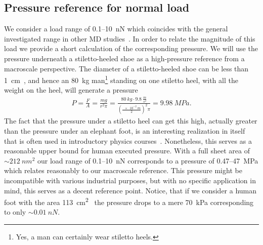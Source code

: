 \subsection{Pressure reference for normal load}
We consider a load range of 0.1--\SI{10}{nN} which coincides with the general investigated range in other \acrshort{MD} studies~\cite{li_evolving_2016, zhu_study_2018, zhu_study_2018}. In order to relate the magnitude of this load we provide a short calculation of the corresponding pressure. We will use the pressure underneath a stiletto-heeled shoe as a high-pressure reference from a macroscale perspective. The diameter of a stiletto-heeled
shoe can be less than \SI{1}{cm}~\cite{stiletto_1}, and hence an \SI{80}{kg} man\footnote{Yes, a man can certainly
wear stiletto heels.} standing on one stiletto heel, with all the weight on the heel, will generate a pressure
\begin{align*}
  P = \frac{F}{A} = \frac{mg}{r^2\pi} = \frac{\SI{80}{kg} \cdot \SI{9.8}{\frac{m}{s^2}}}{{(\frac{\SI{e-2}{m}}{2})}^2 \pi} = \SI{9.98}{MPa}.
\end{align*} 
The fact that the pressure under a stiletto heel can get this high, actually greater than the pressure under an elephant foot, is an interesting realization in itself that is often used in
introductory physics courses~\cite{stiletto_2}. Nonetheless, this serves as a reasonable upper bound for human executed pressure. With
a full sheet area of $\sim \SI{212}{nm^2}$ our load range of 0.1--\SI{10}{nN} corresponds to a pressure of 0.47--\SI{47}{MPa} which relates reasonably to our macroscale reference. This pressure might be incompatible with various industrial purposes, but with no specific application in mind, this serves as a decent reference point. Notice, that if we consider a human foot with the area \SI{113}{cm^2}~\cite{stiletto_3} the pressure drops to a mere \SI{70}{kPa} corresponding to only $\sim \SI{0.01}{nN}$.


